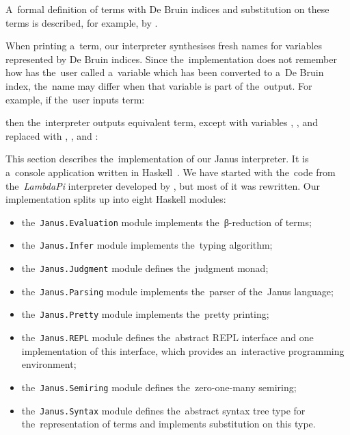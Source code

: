A~formal definition of terms with De Bruin indices and substitution on these
terms is described, for example, by \citet[Chapter~6]{pierce_2002}.

When printing a~term, our interpreter synthesises fresh names for variables
represented by De Bruin indices. Since the~implementation does not remember how
has the~user called a~variable which has been converted to a~De Bruin index,
the~name may differ when that variable is part of the~output. For example, if
the~user inputs term:
\begin{center}
\end{center}
then the~interpreter outputs equivalent term, except with variables
, , and  replaced with
, , and :

\begin{center}
\end{center}

\label{sec:architecture}

This section describes the~implementation of our Janus interpreter. It is
a~console application written in Haskell~\citep{haskell_2010}. We have started
with the~code from the~\emph{LambdaPi} interpreter developed by
\citet{loh_et_al_2010}, but most of it was rewritten. Our implementation splits
up into eight Haskell modules:
\begin{itemize}
  \item the~\texttt{Janus.Evaluation} module implements the~β-reduction of
    terms;
  \item the~\texttt{Janus.Infer} module implements the~typing algorithm;
  \item the~\texttt{Janus.Judgment} module defines the~judgment monad;
  \item the~\texttt{Janus.Parsing} module implements the~parser of the~Janus
    language;
  \item the~\texttt{Janus.Pretty} module implements the~pretty printing;
  \item the~\texttt{Janus.REPL} module defines the~abstract REPL interface and
    one implementation of this interface, which provides an~interactive
    programming environment;
  \item the~\texttt{Janus.Semiring} module defines the~zero-one-many semiring;
  \item the~\texttt{Janus.Syntax} module defines the~abstract syntax tree type
    for the~representation of terms and implements substitution on this type.
\end{itemize}

